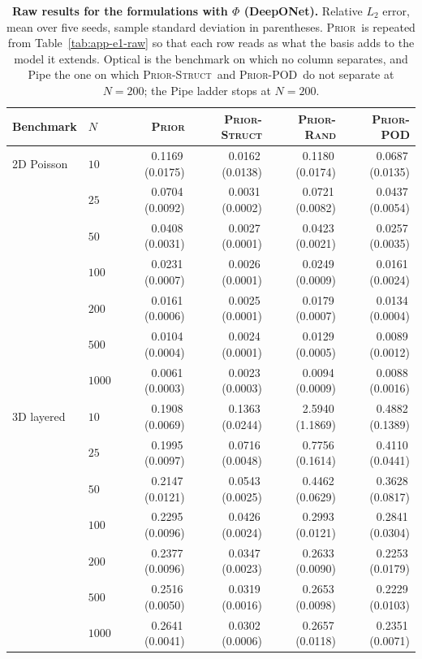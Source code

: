 \documentclass{article}
\newcommand{\armprior}{\textsc{Prior}}
\newcommand{\armstruct}{\textsc{Prior-Struct}}
\newcommand{\armrand}{\textsc{Prior-Rand}}
\newcommand{\armpod}{\textsc{Prior-POD}}
\begin{document}
\begin{table}[t]
\centering
\caption{\textbf{Raw results for the formulations with $\Phi$ (DeepONet).} Relative $L_2$ error,
mean over five seeds, sample standard deviation in parentheses. \armprior\ is repeated from
Table~\ref{tab:app-e1-raw} so that each row reads as what the basis adds to the model it extends.
Optical is the benchmark on which no column separates, and Pipe the one on which \armstruct\ and \armpod\ do not separate at $N{=}200$; the Pipe ladder stops at $N{=}200$.}
\label{tab:app-e1-raw-phi}
\footnotesize
\setlength{\tabcolsep}{12pt}
\renewcommand{\arraystretch}{0.7}
  \vspace{1mm}
\begin{tabular}{llrrrr}
\toprule
Benchmark & $N$ & \armprior & \armstruct & \armrand & \armpod\\
\midrule
2D Poisson & $10$ & 0.1169\,(0.0175) & 0.0162\,(0.0138) & 0.1180\,(0.0174) & 0.0687\,(0.0135)\\
 & $25$ & 0.0704\,(0.0092) & 0.0031\,(0.0002) & 0.0721\,(0.0082) & 0.0437\,(0.0054)\\
 & $50$ & 0.0408\,(0.0031) & 0.0027\,(0.0001) & 0.0423\,(0.0021) & 0.0257\,(0.0035)\\
 & $100$ & 0.0231\,(0.0007) & 0.0026\,(0.0001) & 0.0249\,(0.0009) & 0.0161\,(0.0024)\\
 & $200$ & 0.0161\,(0.0006) & 0.0025\,(0.0001) & 0.0179\,(0.0007) & 0.0134\,(0.0004)\\
 & $500$ & 0.0104\,(0.0004) & 0.0024\,(0.0001) & 0.0129\,(0.0005) & 0.0089\,(0.0012)\\
 & $1000$ & 0.0061\,(0.0003) & 0.0023\,(0.0003) & 0.0094\,(0.0009) & 0.0088\,(0.0016)\\
3D layered & $10$ & 0.1908\,(0.0069) & 0.1363\,(0.0244) & 2.5940\,(1.1869) & 0.4882\,(0.1389)\\
 & $25$ & 0.1995\,(0.0097) & 0.0716\,(0.0048) & 0.7756\,(0.1614) & 0.4110\,(0.0441)\\
 & $50$ & 0.2147\,(0.0121) & 0.0543\,(0.0025) & 0.4462\,(0.0629) & 0.3628\,(0.0817)\\
 & $100$ & 0.2295\,(0.0096) & 0.0426\,(0.0024) & 0.2993\,(0.0121) & 0.2841\,(0.0304)\\
 & $200$ & 0.2377\,(0.0096) & 0.0347\,(0.0023) & 0.2633\,(0.0090) & 0.2253\,(0.0179)\\
 & $500$ & 0.2516\,(0.0050) & 0.0319\,(0.0016) & 0.2653\,(0.0098) & 0.2229\,(0.0103)\\
 & $1000$ & 0.2641\,(0.0041) & 0.0302\,(0.0006) & 0.2657\,(0.0118) & 0.2351\,(0.0071)\\

\end{tabular}
\end{table}
\end{document}
